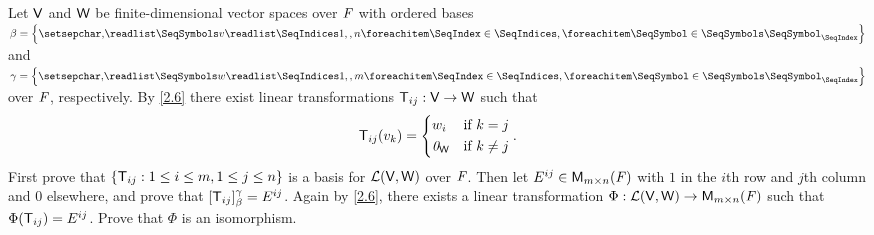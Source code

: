 \begin{ex}\label{ex:2.4.21}
	Let \(\mathsf{V}\) and \(\mathsf{W}\) be finite-dimensional vector spaces over \(\mathit{F}\) with ordered bases \(\beta = \set{\seq{v}{1,,n}}\) and \(\gamma = \set{\seq{w}{1,,m}}\) over \(\mathit{F}\), respectively.
	By \cref{2.6} there exist linear transformations \(\mathsf{T}_{i j} : \mathsf{V} \to \mathsf{W}\) such that
	\[
		\mathsf{T}_{i j}(v_k) = \begin{dcases}
			w_i      & \text{if } k = j    \\
			\mathit{0}_{\mathsf{W}} & \text{if } k \neq j
		\end{dcases}.
	\]
	First prove that \(\left\lbrace\mathsf{T}_{i j} : 1 \leq i \leq m, 1 \leq j \leq n\right\rbrace\) is a basis for \(\mathcal{L}(\mathsf{V}, \mathsf{W})\) over \(\mathit{F}\).
	Then let \(E^{i j} \in \mathsf{M}_{{m} \times n}({\mathit{F}})\) with \(1\) in the \(i\)th row and \(j\)th column and \(0\) elsewhere, and prove that \([\mathsf{T}_{i j}]_{\beta}^{\gamma} = E^{i j}\).
	Again by \cref{2.6}, there exists a linear transformation \(\Phi : \mathcal{L}(\mathsf{V}, \mathsf{W}) \to \mathsf{M}_{{m} \times n}({\mathit{F}})\) such that \(\Phi(\mathsf{T}_{i j}) = E^{i j}\).
	Prove that \(\Phi\) is an isomorphism.
\end{ex}

